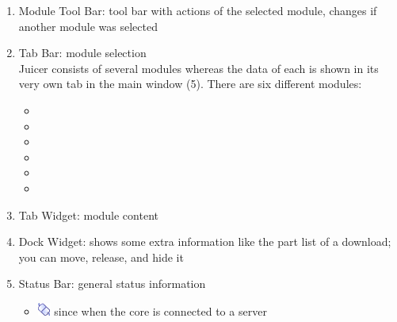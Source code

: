 \documentclass[a4paper,10pt]{book}
\begin{document}
\begin{enumerate}
 \item Module Tool Bar: tool bar with actions of the selected module, changes if another module was selected
 \item Tab Bar: module selection\\Juicer consists of several modules whereas the data of each is shown in its very own tab in the main window (5). There are six different modules:\\
 \begin{itemize}
  \item {} 
  \item {} 
  \item {} 
  \item {} 
  \item {} 
  \item {} 
 \end{itemize}
 \item Tab Widget: module content
 \item Dock Widget: shows some extra information like the part list of a download; you can move, release, and hide it
 \item Status Bar: general status information
 \begin{itemize}
  \item \includegraphics[width=16px]{../small/connect_established.png} since when the core is connected to a server

\end{itemize}
\end{enumerate}
\end{document}
